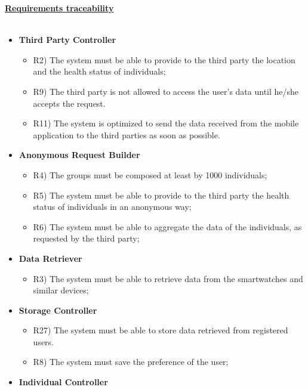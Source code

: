 	\underline{\textbf{Requirements traceability}}\\\\
	\begin{itemize}
		\item \textbf{Third Party Controller}
		\begin{itemize}
			\item R2) The system must be able to provide to the third party the location and the health status of individuals;
			\item R9) The third party is not allowed to access the user’s data until he/she accepts the request.\\
			\item R11) The system is optimized to send the data received from the mobile application to the third parties as soon as possible.\\
		\end{itemize}
		\item \textbf{Anonymous Request Builder}
		\begin{itemize}
			\item R4) The groups must be composed at least by 1000 individuals;\\
			\item R5) The system must be able to provide to the third party the health status of individuals in an anonymous way;\\
			\item R6) The system must be able to aggregate the data of the individuals, as requested by the third party;\\
		\end{itemize}
		\item \textbf{Data Retriever}
		\begin{itemize}
			\item R3) The system must be able to retrieve data from the smartwatches and similar devices;\\
		\end{itemize}
		\item \textbf{Storage Controller}
		\begin{itemize}
			\item R27) The system must be able to store data retrieved from registered users.\\
			\item R8) The system must save the preference of the user;\\
		\end{itemize}
		\item \textbf{Individual Controller}

\end{itemize}
